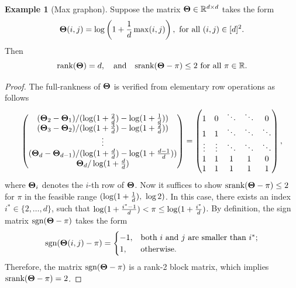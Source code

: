 \documentclass[11pt]{article}
\theoremstyle{plain}
\theoremstyle{definition}
\newtheorem{example}{Example}
\def\sign{\textup{sgn}}
\def\srank{\textup{srank}}
\def\rank{\textup{rank}}
\begin{document}
\begin{example}[Max graphon]\label{example:max} Suppose the matrix $\bm{\Theta}\in\mathbb{R}^{d\times d}$ takes the form 
\[
\bm{\Theta}(i,j)=\log\left(1+{1\over d}\max(i,j)\right), \ \text{for all }(i,j)\in[d]^2.
\]
 Then 
 \[
 \rank(\mTheta)=d, \quad \text{and}\quad \srank(\mTheta-\pi)\leq 2\ \text{for all }\pi\in\mathbb{R}. 
 \]
\end{example}
\begin{proof}
The full-rankness of $\bm{\Theta}$ is verified from elementary row operations as follows
\begin{align}
\begin{pmatrix}
(\bm{\Theta}_2-\bm{\Theta}_1)/(\log(1+\frac{2}{d})-\log(1+\frac{1}{d}))\\(\bm{\Theta}_3-\bm{\Theta}_2)/(\log(1+\frac{3}{d})-\log(1+\frac{2}{d}))\\\vdots\\ (\bm{\Theta}_d-\bm{\Theta}_{d-1})/(\log(1+\frac{d}{d})-\log(1+\frac{d-1}{d}))\\\bm{\Theta}_d/\log(1+\frac{d}{d})
\end{pmatrix} = \begin{pmatrix}
 1&          0  &      \ddots  &        \ddots       &          0 \\
1& 1 & \ddots &            \ddots   &   \ddots          \\
      \vdots &     \vdots & \ddots &       \ddots &    \ddots         \\
 1 & 1 &1 & 1 &0\\
 1 & 1 &1 & 1 &1
\end{pmatrix},
\end{align}
where $\bm{\Theta}_i$ denotes the $i$-th row of $\bm{\Theta}$. 
Now it suffices to show $\srank(\mTheta-\pi)\leq 2$ for $\pi$ in the feasible range $(\log(1+{1\over d}),\ \log 2)$. In this case, there exists an index $i^*\in\{2,\ldots,d\}$, such that $\log(1+{i^*-1\over d})< \pi\leq \log(1+{i^*\over d})$. By definition, the sign matrix $\sign (\mTheta-\pi)$ takes the form
\begin{equation}\label{eq:matrix}
\sign (\mTheta(i,j)-\pi)=
\begin{cases}
-1, & \text{both $i$ and $j$ are smaller than $i^*$};\\
1, & \text{otherwise}.
\end{cases}
\end{equation}
Therefore, the matrix $\sign (\mTheta-\pi)$ is a rank-2 block matrix, which implies $\srank(\mTheta-\pi)=2$. 
\end{proof}
\end{document}
